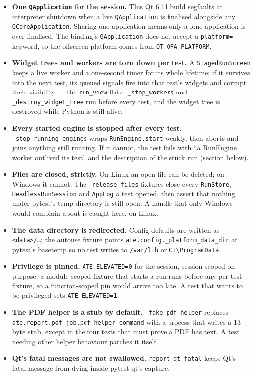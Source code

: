 \begin{itemize}
  \item \textbf{One \texttt{QApplication} for the session.} This Qt 6.11 build segfaults at interpreter
    shutdown when a live \texttt{QApplication} is finalised alongside any \texttt{QCoreApplication}.
    Sharing one application means only a lone application is ever finalised. The binding's
    \texttt{QApplication} does not accept a \texttt{platform=} keyword, so the offscreen platform comes
    from \texttt{QT\_QPA\_PLATFORM}.
  \item \textbf{Widget trees and workers are torn down per test.} A \texttt{StagedRunScreen} keeps a live
    worker and a one-second timer for its whole lifetime; if it survives into the next test, its queued
    signals fire into that test's widgets and corrupt their visibility --- the \texttt{run\_view} flake.
    \texttt{\_stop\_workers} and \texttt{\_\allowbreak{}destroy\_\allowbreak{}widget\_\allowbreak{}tree} run before every test, and the widget
    tree is destroyed while Python is still alive.
  \item \textbf{Every started engine is stopped after every test.} \texttt{\_\allowbreak{}stop\_\allowbreak{}running\_\allowbreak{}engines}
    wraps \texttt{RunEngine.start} weakly, then aborts and joins anything still running. If it cannot, the
    test fails with ``a RunEngine worker outlived its test'' and the description of the stuck run
    (section below).
  \item \textbf{Files are closed, strictly.} On Linux an open file can be deleted; on Windows it cannot.
    The \texttt{\_release\_files} fixtures close every \texttt{RunStore}, \texttt{HeadlessRunSession} and
    \texttt{AppLog} a test opened, then assert that nothing under pytest's temp directory is still open.
    A handle that only Windows would complain about is caught here, on Linux.
  \item \textbf{The data directory is redirected.} Config defaults are written as
    \texttt{<data>/\dots}; the autouse fixture points \texttt{ate.config.\_\allowbreak{}platform\_\allowbreak{}data\_\allowbreak{}dir} at
    pytest's basetemp so no test writes to \texttt{/var/lib} or \texttt{C:\textbackslash ProgramData}.
  \item \textbf{Privilege is pinned.} \texttt{ATE\_ELEVATED=0} for the session, session-scoped on purpose:
    a module-scoped fixture that starts a run runs before any per-test fixture, so a function-scoped pin
    would arrive too late. A test that wants to be privileged sets \texttt{ATE\_ELEVATED=1}.
  \item \textbf{The PDF helper is a stub by default.} \texttt{\_fake\_pdf\_helper} replaces
    \texttt{ate.report.pdf\_\allowbreak{}job.pdf\_\allowbreak{}helper\_\allowbreak{}command} with a process that writes a 13-byte stub, except
    in the four tests that must prove a PDF has text. A test needing other helper behaviour patches it
    itself.
  \item \textbf{Qt's fatal messages are not swallowed.} \texttt{report\_qt\_fatal} keeps Qt's fatal
    message from dying inside pytest-qt's capture.
\end{itemize}

